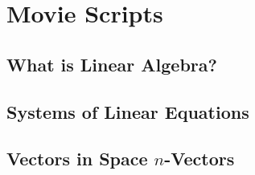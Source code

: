 \documentclass[12pt]{book}
\newcommand{\1}{{\mathrm 1\hspace*{-0.4ex}%
\rule{0.1ex}{1.52ex}\hspace*{0.2ex}}}
\begin{document}
\appendix







\small


%

%

%
%

%
%
%
%

\chapter{Movie Scripts}

\footnotesize
\section{What is Linear Algebra?}

%
%
%
%
%
%
%
%
%

%
\section{Systems of Linear Equations}


%

%

%
%
%
%
%




%


%

%

%
\section{Vectors in Space $n$-Vectors}
%
%
%
%
%

%

%
\end{document}
